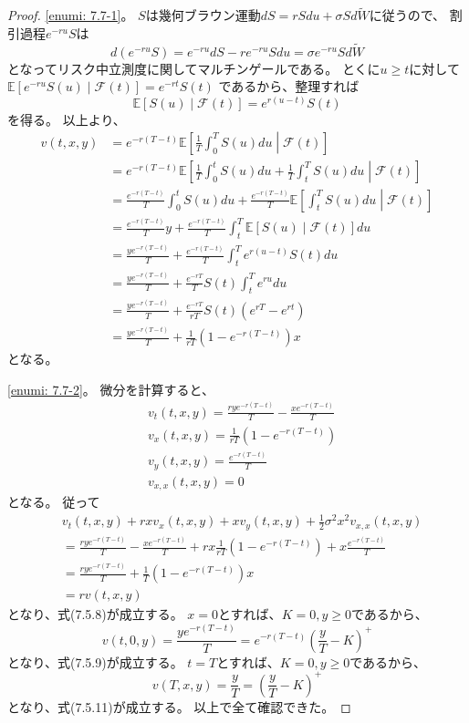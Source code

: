 \documentclass[uplatex]{jsarticle}
\theoremstyle{definition}
\def\E{\mathbb{E}}
\def\mcF{\mathcal{F}}
\begin{document}
\begin{proof}
  \ref{enumi: 7.7-1}。
  \(S\)は幾何ブラウン運動\(dS = rSdu + \sigma S d\tilde{W}\)に従うので、
  割引過程\(e^{-ru}S\)は
  \[
  d(e^{-ru}S) = e^{-ru}dS - re^{-ru}Sdu = \sigma e^{-ru} S d\tilde{W}
  \]
  となってリスク中立測度に関してマルチンゲールである。
  とくに\(u\geq t\)に対して
  \(\E\left[ e^{-ru}S(u)\middle| \mcF(t)\right] = e^{-rt}S(t)\)
  であるから、整理すれば
  \[
  \E\left[ S(u)\middle| \mcF(t)\right] = e^{r(u-t)}S(t)
  \]
  を得る。
  以上より、
  \begin{align*}
    v(t,x,y)
    &= e^{-r(T-t)}\E\left[ \frac{1}{T}\int_0^TS(u)du
    \middle| \mcF(t)\right] \\
    &= e^{-r(T-t)}\E\left[
    \frac{1}{T}\int_0^tS(u)du + \frac{1}{T}\int_t^TS(u)du
    \middle| \mcF(t)\right]  \\
    &= \frac{e^{-r(T-t)}}{T}\int_0^tS(u)du
    + \frac{e^{-r(T-t)}}{T}\E\left[ \int_t^TS(u)du
    \middle| \mcF(t)\right] \\
    &= \frac{e^{-r(T-t)}}{T}y
    + \frac{e^{-r(T-t)}}{T}\int_t^T
    \E\left[ S(u) \middle| \mcF(t)\right] du \\
    &= \frac{ye^{-r(T-t)}}{T}
    + \frac{e^{-r(T-t)}}{T}\int_t^T e^{r(u-t)}S(t) du \\
    &= \frac{ye^{-r(T-t)}}{T}
    + \frac{e^{-rT}}{T}S(t)\int_t^T e^{ru} du \\
    &= \frac{ye^{-r(T-t)}}{T}
    + \frac{e^{-rT}}{rT}S(t)\left( e^{rT}-e^{rt} \right) \\
    &= \frac{ye^{-r(T-t)}}{T}
    + \frac{1}{rT}\left( 1-e^{-r(T-t)} \right) x
  \end{align*}
  となる。

  \ref{enumi: 7.7-2}。
  微分を計算すると、
  \begin{align*}
    &v_t(t,x,y)
    = \frac{rye^{-r(T-t)}}{T} - \frac{xe^{-r(T-t)}}{T} \\
    &v_x(t,x,y)
    = \frac{1}{rT}\left( 1-e^{-r(T-t)} \right) \\
    &v_y(t,x,y)
    = \frac{e^{-r(T-t)}}{T} \\
    &v_{x,x}(t,x,y)
    = 0
  \end{align*}
  となる。
  従って
  \begin{align*}
    &v_t(t,x,y) + rxv_x(t,x,y) + xv_y(t,x,y)
    + \frac{1}{2}\sigma^2x^2v_{x,x}(t,x,y) \\
    &= \frac{rye^{-r(T-t)}}{T} - \frac{xe^{-r(T-t)}}{T}
    + rx\frac{1}{rT}\left( 1-e^{-r(T-t)} \right)
    + x\frac{e^{-r(T-t)}}{T} \\
    &= \frac{rye^{-r(T-t)}}{T}
    + \frac{1}{T}\left( 1-e^{-r(T-t)} \right) x \\
    &= rv(t,x,y)
  \end{align*}
  となり、式(7.5.8)が成立する。
  \(x=0\)とすれば、\(K=0, y\geq 0\)であるから、
  \[
  v(t,0,y) = \frac{ye^{-r(T-t)}}{T}
  = e^{-r(T-t)}\left( \frac{y}{T} - K\right)^+
  \]
  となり、式(7.5.9)が成立する。
  \(t=T\)とすれば、\(K=0, y\geq 0\)であるから、
  \[
  v(T,x,y) = \frac{y}{T}
  = \left( \frac{y}{T} - K\right)^+
  \]
  となり、式(7.5.11)が成立する。
  以上で全て確認できた。


\end{proof}
\end{document}

